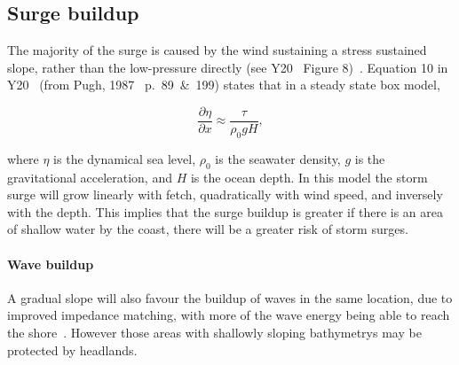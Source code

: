 \subsection{Surge buildup}

The majority of the surge is caused by the wind
sustaining a stress sustained slope,
rather than the low-pressure directly
(see Y20~\cite{ZannaPreprint} Figure 8)~\cite{emanuel2005divine}. Equation 10 in Y20~\cite{ZannaPreprint}
(from Pugh, 1987~\cite{pugh1987tides} p.~89~\&~199) states that in a steady state box model,

\begin{equation}
\frac{\partial \eta}{\partial x}
\approx \frac{\tau}{\rho_{0} g H},
\end{equation}

where $\eta$ is the dynamical sea level, $\rho_0$ is the seawater density,
$g$ is the gravitational acceleration, and $H$ is the ocean depth.
In this model
the storm surge
will grow linearly with fetch,
quadratically with wind speed,
and inversely with the depth.
This implies that the surge buildup is greater if there is an area of
shallow water by the coast, there will
be a greater risk of storm surges.


\paragraph{Wave buildup}

A gradual slope will also favour the buildup of waves in the same location, due to
improved impedance matching, with more of the wave energy being able to
reach the shore~\cite{pugh1987tides}. However those areas with shallowly sloping
bathymetrys may be protected by headlands.

